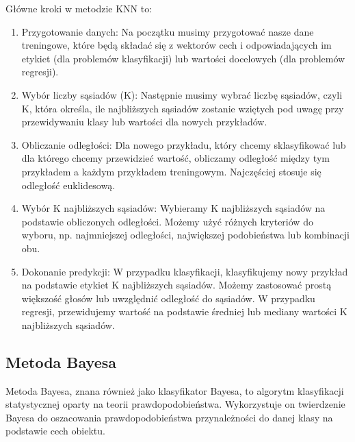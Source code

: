 \documentclass{article}
\begin{document}
Główne kroki w metodzie KNN to:
\begin{enumerate}
\item Przygotowanie danych: Na początku musimy przygotować nasze dane treningowe, które będą składać się z wektorów cech i odpowiadających im etykiet (dla problemów klasyfikacji) lub wartości docelowych (dla problemów regresji).
\item Wybór liczby sąsiadów (K): Następnie musimy wybrać liczbę sąsiadów, czyli K, która określa, ile najbliższych sąsiadów zostanie wziętych pod uwagę przy przewidywaniu klasy lub wartości dla nowych przykładów.
\item Obliczanie odległości: Dla nowego przykładu, który chcemy sklasyfikować lub dla którego chcemy przewidzieć wartość, obliczamy odległość między tym przykładem a każdym przykładem treningowym. Najczęściej stosuje się odległość euklidesową.
\item Wybór K najbliższych sąsiadów: Wybieramy K najbliższych sąsiadów na podstawie obliczonych odległości. Możemy użyć różnych kryteriów do wyboru, np. najmniejszej odległości, największej podobieństwa lub kombinacji obu.
\item Dokonanie predykcji: W przypadku klasyfikacji, klasyfikujemy nowy przykład na podstawie etykiet K najbliższych sąsiadów. Możemy zastosować prostą większość głosów lub uwzględnić odległość do sąsiadów. W przypadku regresji, przewidujemy wartość na podstawie średniej lub mediany wartości K najbliższych sąsiadów.
\end{enumerate}
\subsection{Metoda Bayesa}
Metoda Bayesa, znana również jako klasyfikator Bayesa, to algorytm klasyfikacji statystycznej oparty na teorii prawdopodobieństwa. Wykorzystuje on twierdzenie Bayesa do oszacowania prawdopodobieństwa przynależności do danej klasy na podstawie cech obiektu.
\end{document}
